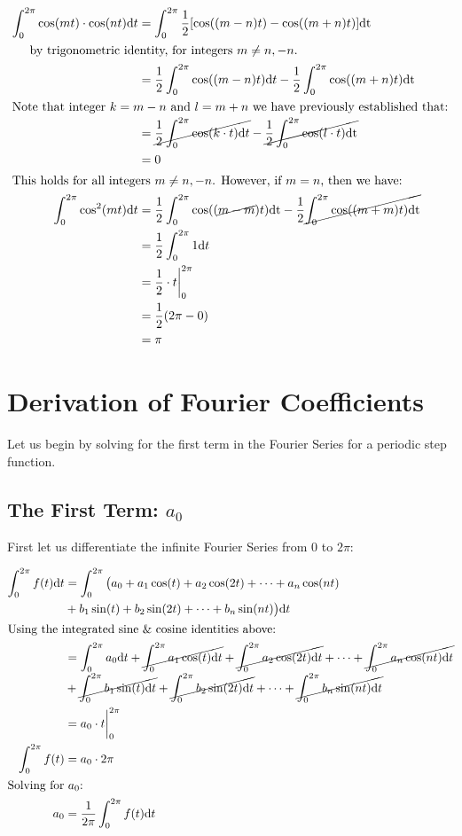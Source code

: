 \documentclass[10pt]{article} %
\begin{document}
\begin{align*}
    \int_0^{2\pi} \cos(mt) \cdot \cos(nt) \mathrm{d}t &=\int_0^{2\pi}\frac12[\cos((m-n)t) - \cos((m+n)t)]\mathrm{dt} \\
    \intertext{\hspace{0.5cm}by trigonometric identity, for integers $m \neq n, -n$.}
    & =\frac12\int_0^{2\pi}\cos((m-n)t)\mathrm{d}t - \frac12\int_0^{2\pi}\cos((m+n)t)\mathrm{dt}\\
    \intertext{Note that integer $k=m-n$ and $l=m+n$ we have previously established that:}
    & =\cancel{\frac12\int_0^{2\pi}\cos(k \cdot t)\mathrm{d}t} - \cancel{\frac12\int_0^{2\pi}\cos(l \cdot t)\mathrm{dt}}\\
    & = 0 \\
    \intertext{This holds for all integers $m \neq n, -n$. However, if $m = n$, then we have:}
    \int_0^{2\pi} \cos^2(mt)\mathrm{d}t & = \frac12\int_0^{2\pi}\cos((\cancel{m-m})t)\mathrm{dt} - \frac12\cancel{\int_0^{2\pi}\cos((m+m)t)\mathrm{dt}}\\
    & = \frac12\int_0^{2\pi}1\mathrm{d}t\\
    & = \frac12 \cdot t \bigg\rvert_0^{2\pi} \\
    & = \frac12 (2\pi - 0) \\
    & = \pi
\end{align*}

\section{Derivation of Fourier Coefficients}

Let us begin by solving for the first term in the Fourier Series for a periodic step function.

\subsection{The First Term: $a_0$}


First let us differentiate the infinite Fourier Series from $0$ to $2\pi$:

\begin{align*}
    \int_0^{2\pi} f(t) \mathrm{d}t & = \int_0^{2\pi} \big( a_0 + a_1\cos(t) + a_2\cos(2t) + \dots + a_n\cos(nt) \\
    & + b_1\sin(t) + b_2\sin(2t) + \dots + b_n\sin(nt)\big)\mathrm{d}t\\
    \intertext{Using the integrated sine \& cosine identities above:}
    & = \int_0^{2\pi} a_0 \mathrm{d}t + \cancel{\int_0^{2\pi} a_1\cos(t) \mathrm{d}t} + \cancel{\int_0^{2\pi} a_2\cos(2t) \mathrm{d}t} + \dots + \cancel{\int_0^{2\pi} a_n\cos(nt) \mathrm{d}t} \\
    & + \cancel{\int_0^{2\pi} b_1\sin(t) \mathrm{d}t} + \cancel{\int_0^{2\pi} b_2\sin(2t) \mathrm{d}t} + \dots + \cancel{\int_0^{2\pi} b_n\sin(nt) \mathrm{d}t} \\
    & = a_0 \cdot t \bigg\vert_0^{2\pi} \\
    \int_0^{2\pi} f(t) & = a_0 \cdot 2\pi \\
    \intertext{Solving for $a_0$:}
    a_0 & = \frac{1}{2\pi}\int_0^{2\pi} f(t) \mathrm{d}t
\end{align*} 
\end{document}
